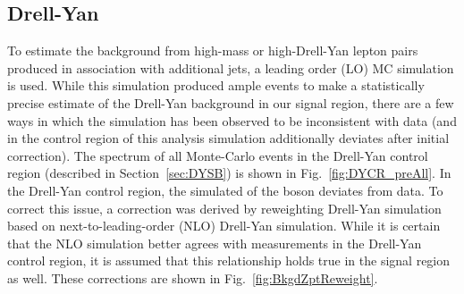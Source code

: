 \subsection{Drell-Yan}
To estimate the background from high-mass or high-\pt Drell-Yan lepton pairs produced in association with additional jets, a leading order (LO) MC simulation is used. While this simulation produced ample events to make a statistically precise estimate of the Drell-Yan background in our signal region, there are a few ways in which the simulation has been observed to be inconsistent with data (and in the control region of this analysis simulation additionally deviates after initial correction). The spectrum of all Monte-Carlo events in the Drell-Yan control region (described in Section~\ref{sec:DYSB}) is shown in Fig.~\ref{fig:DYCR_preAll}.
In the Drell-Yan control region, the simulated \pt of the \Z boson deviates from data. To correct this issue, a \pt correction was derived by reweighting Drell-Yan simulation based on next-to-leading-order (NLO) Drell-Yan simulation. While it is certain that the NLO simulation better agrees with measurements in the Drell-Yan control region, it is assumed that this relationship holds true in the signal region as well. These corrections are shown in Fig.~\ref{fig:BkgdZptReweight}.
